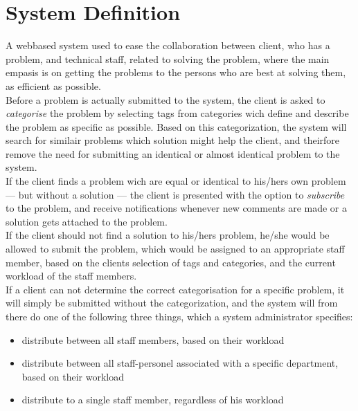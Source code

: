 \section{System Definition}
\label{sec:systemdefinition}

A webbased system used to ease the collaboration between client, who has a problem, and technical staff, related to solving the problem, where the main empasis is on getting the problems to the persons who are best at solving them, as efficient as possible. \\


Before a problem is actually submitted to the system, the client is asked to \textit{categorise} the problem by selecting tags from categories wich define and describe the problem as specific as possible. Based on this categorization, the system will search for similair problems which solution might help the client, and theirfore remove the need for submitting an identical or almost identical problem to the system.\\

If the client finds a problem wich are equal or identical to his/hers own problem --- but without a solution --- the client is presented with the option to \textit{subscribe} to the problem, and receive notifications whenever new comments are made or a solution gets attached to the problem. \\

If the client should not find a solution to his/hers problem, he/she would be allowed to submit the problem, which would be assigned to an appropriate staff member, based on the clients selection of tags and categories, and the current workload of the staff members. \\

If a client can not determine the correct categorisation for a specific problem, it will simply be submitted without the categorization, and the system will from there do one of the following three things, which a system administrator specifies:

\begin{itemize}
	\item distribute between all staff members, based on their workload
	\item distribute between all staff-personel associated with a specific department, based on their workload
	\item distribute to a single staff member, regardless of his workload
\end{itemize}

